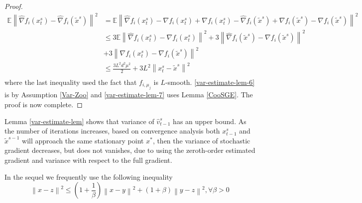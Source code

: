 \documentclass{article}
\newcommand*{\E}{\mathbb{E}}
\newcommand{\norm}[1]{\left\lVert#1\right\rVert}
\theoremstyle{definition}
\theoremstyle{remark}
\begin{document}
\begin{proof}
 {\color{Brown}
 \begin{equation}
 \begin{split}
 \E \norm{\hat{\nabla} f_i(x_{t}^s)-\hat{\nabla} f_i(\tilde{x}^s)}^2 &= \E \norm{ \hat{\nabla} f_i(x_{t}^s)-{\nabla} f_i(x_{t}^s) + {\nabla} f_i(x_{t}^s)-\hat{\nabla} f_i(\tilde{x}^s)+{\nabla} f_i(\tilde{x}^s)-{\nabla} f_i(\tilde{x}^s)}^2\\
 &\leq 3 \E \norm{ \hat{\nabla} f_i(x_{t}^s)-{\nabla} f_i(x_{t}^s)}^2 + 3\norm{\hat{\nabla} f_i(\tilde{x}^s) - {\nabla} f_i(\tilde{x}^s)}^2\\
 &+ 3\norm{{\nabla} f_i(x_{t}^s) - {\nabla} f_i(\tilde{x}^s)}^2\\
 &\leq \frac{3 L^2 d^2 \mu^2}{2} + 3L^2 \norm{x_{t}^s-\tilde{x}^s}^2\\
 \end{split}
 \end{equation}
 }
  where the last inequality used the fact that $f_{i,\mu_j}$ is $L$-smooth. \eqref{var-estimate-lem-6} is by Assumption \ref{Var-Zoo} and \eqref{var-estimate-lem-7} uses Lemma \ref{CooSGE}. The proof is now complete.
\end{proof}
{\color{Green}
Lemma \ref{var-estimate-lem} shows that variance of $\hat{v}_{t-1}^s$ has an upper bound. As the number of iterations increases, based on convergence analysis both $x_{t-1}^s$ and $\tilde{x}^{s-1}$ will approach the same stationary point $x^*$, then the
variance of stochastic gradient decreases, but does not vanishes, due to using the zeroth-order estimated gradient and variance with respect to the full gradient.
}

In the sequel we frequently use the following inequality
\begin{equation}\label{young}
\norm{x-z}^2 \leq (1+\frac{1}{\beta})\norm{x-y}^2 + (1+\beta) \norm{{y-z}}^2, \forall \beta> 0
\end{equation}
\end{document}
